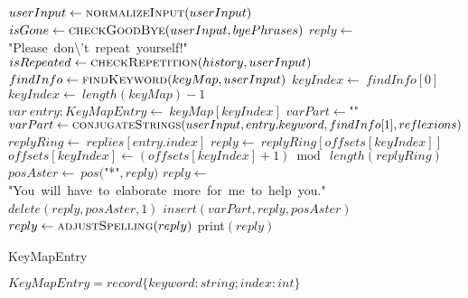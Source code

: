 \documentclass[a4paper,10pt]{article}
\begin{document}
\begin{algorithm}
\begin{algorithmic}[5]
    \State {}
    \State \(userInput\gets\Call{normalizeInput}{userInput}\)
    \State \(isGone\gets\Call{checkGoodBye}{userInput,byePhrases}\)
      \State \(reply\gets\)"{}Please\ don\textbackslash{}'{}t\ repeat\ yourself!"{}\(\)
      \State \(isRepeated\gets\Call{checkRepetition}{history,userInput}\)
        \State \(findInfo\gets\Call{findKeyword}{keyMap,userInput}\)
        \State \(keyIndex\gets\ findInfo[0]\)
          \State \(keyIndex\gets\ length(keyMap)-1\)
        \EndIf
        \State \(var\ entry:KeyMapEntry\gets\ keyMap[keyIndex]\)
        \State \(varPart\gets\)"{}"{}\(\)
          \State \(varPart\gets\Call{conjugateStrings}{userInput,entry.keyword,findInfo[1],reflexions}\)
        \EndIf
        \State \(replyRing\gets\ replies[entry.index]\)
        \State \(reply\gets\ replyRing[offsets[keyIndex]]\)
        \State \(offsets[keyIndex]\gets(offsets[keyIndex]+1)\bmod\ length(replyRing)\)
        \State \(posAster\gets\ pos(\)"{}*"{}\(,reply)\)
            \State \(reply\gets\)"{}You\ will\ have\ to\ elaborate\ more\ for\ me\ to\ help\ you."{}\(\)
          \Else
            \State \(delete(reply,posAster,1)\)
            \State \(insert(varPart,reply,posAster)\)
          \EndIf
        \EndIf
        \State \(reply\gets\Call{adjustSpelling}{reply}\)
      \EndIf
      \State \(\)print\((reply)\)
    \EndIf
\EndProcedure
\end{algorithmic}
\end{algorithm}


\begin{algorithm}
\caption{KeyMapEntry}
\begin{algorithmic}[5]
\State {}
    \State \(KeyMapEntry = record\{keyword:string;index:int\}\)
  \EndDecl
\EndProcedure
\end{algorithmic}
\end{algorithm}
\end{document}
